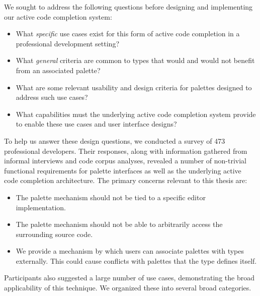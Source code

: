 \begin{contribution} 
We sought to address the following questions before designing and implementing our active code completion system:

\begin{itemize}
\item What {\it specific} use cases exist for this form of active code completion in a professional development setting? 
\item What {\it general} criteria are common to types that would and would not benefit from an associated palette?
\item What are some relevant usability and design criteria for palettes designed to address such use cases?
\item What capabilities must the underlying active code completion system provide to enable these use cases and user interface designs?
\end{itemize}

To help us answer these design questions, we conducted a survey of 473 professional developers. Their responses, along with information gathered from informal interviews and code corpus analyses, revealed a number of non-trivial functional requirements for palette interfaces as well as the underlying active code completion architecture. The primary concerns relevant to this thesis are:
\begin{itemize}
\item The palette mechanism should not be tied to a specific editor implementation.%
\item The palette mechanism should not be able to arbitrarily access the surrounding source code. %
\item We provide a mechanism by which users can associate palettes with types externally. This could cause conflicts with palettes that the type defines itself. %
\end{itemize}

Participants also suggested a large number of use cases, demonstrating the broad applicability of this technique. We organized these into several broad categories. 
\end{contribution}

